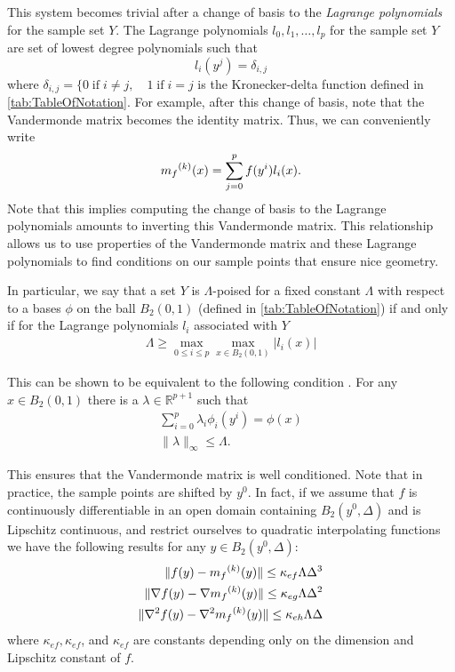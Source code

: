This system becomes trivial after a change of basis to the \emph{Lagrange polynomials} for the sample set $Y$.
The Lagrange polynomials $l_0, l_1, \ldots, l_p$ for the sample set $Y$ are set of lowest degree polynomials such that
\[
l_i(y^j) = \delta_{i,j}
\]
where $\delta_{i,j} = \{0 \;\text{if}\; i\ne j,\quad 1 \;\text{if} \; i = j $ is the Kronecker-delta function defined in \cref{tab:TableOfNotation}.
For example, after this change of basis, note that the Vandermonde matrix becomes the identity matrix.
Thus, we can conveniently write
\[
\label{reg}
{{m}_f}^{(k)}(x) = \sum^p_{j=0}f(y^i)l_i(x).
\]
Note that this implies computing the change of basis to the Lagrange polynomials amounts to inverting this Vandermonde matrix.
This relationship allows us to use properties of the Vandermonde matrix and these Lagrange polynomials to find conditions on our sample points that ensure nice geometry.

In particular, we say that a set $Y$ is $\Lambda$-poised for a fixed constant $\Lambda$ with respect to a bases $\phi$ on the ball 
$B_2(0, 1)$ (defined in \cref{tab:TableOfNotation}) if and only if for the Lagrange polynomials $l_i$ associated with $Y$
\begin{align}
\Lambda \ge \max_{0\le i\le p}\max_{x\in B_2(0, 1)}|l_i(x)|
\end{align}

This can be shown to be equivalent to the following condition \cite{DUMMY:intro_book}.
For any $x \in B_2(0, 1)$ there is a $\lambda \in \mathbb R ^ {p+1}$ such that 
\begin{align}
\sum_{i=0}^p\lambda_i\phi_i(y^i) = \phi(x) \\
\|\lambda\|_{\infty} \le \Lambda.
\end{align}

This ensures that the Vandermonde matrix is well conditioned.
Note that in practice, the sample points are shifted by $y^0$.
In fact, if we assume that $f$ is continuously differentiable in an open domain containing $B_2(y^0, \Delta)$ and is Lipschitz continuous, and restrict ourselves to quadratic interpolating functions we have the following results for any $y \in B_2(y^0, \Delta)$:
\begin{align}
 \|f(y) - {{m}_f}^{(k)}(y)\| \le \kappa_{ef} \Lambda \Delta^3 \\
 \|\nabla f(y) - \nabla {{m}_f}^{(k)}(y)\| \le \kappa_{eg} \Lambda \Delta^2 \\
 \|\nabla^2 f(y) - \nabla^2 {{m}_f}^{(k)}(y)\| \le \kappa_{eh}\Lambda \Delta \\
\end{align}
where
$\kappa_{ef}, \kappa_{ef}$, and $\kappa_{ef}$ are constants depending only on the dimension and Lipschitz constant of $f$.

